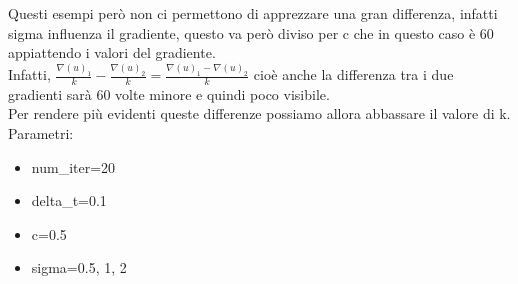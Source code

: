 Questi esempi però non ci permettono di apprezzare una gran differenza, infatti sigma influenza il gradiente, questo va però diviso per c che in questo caso è 60 appiattendo i valori del gradiente.\\
Infatti, $\frac{\nabla(u)_1}{k}-\frac{\nabla(u)_2}{k}=\frac{\nabla(u)_1-\nabla(u)_2}{k}$ cioè anche la differenza tra i due gradienti sarà 60 volte minore e quindi poco visibile.\\
Per rendere più evidenti queste differenze possiamo allora abbassare il valore di k.\\
Parametri:
\begin{itemize}
    \item num\_iter=20
    \item delta\_t=0.1
    \item c=0.5
    \item sigma=0.5, 1, 2
\end{itemize}

